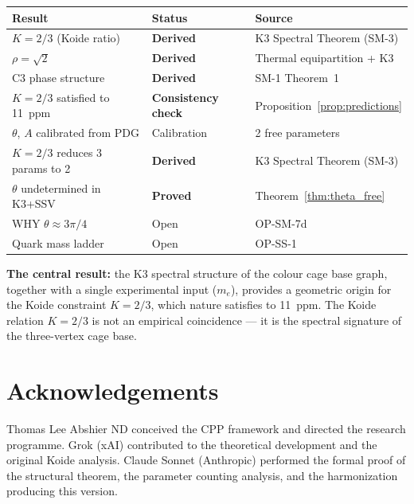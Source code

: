 \documentclass[11pt]{article}
\begin{document}
\begin{center}
\renewcommand{\arraystretch}{1.3}
\begin{tabular}{p{5.5cm}lp{5cm}}
\toprule
Result & Status & Source \\
\midrule
$K = 2/3$ (Koide ratio) & \textbf{Derived} & K3 Spectral Theorem (SM-3) \\
$\rho = \sqrt{2}$ & \textbf{Derived} & Thermal equipartition + K3 \\
C3 phase structure & \textbf{Derived} & SM-1 Theorem~1 \\
$K=2/3$ satisfied to 11~ppm & \textbf{Consistency check} & Proposition~\ref{prop:predictions} \\
$\theta$, $A$ calibrated from PDG & Calibration & 2 free parameters \\
$K=2/3$ reduces 3 params to 2 & \textbf{Derived} & K3 Spectral Theorem (SM-3) \\
$\theta$ undetermined in K3+SSV & \textbf{Proved} & Theorem~\ref{thm:theta_free} \\
WHY $\theta \approx 3\pi/4$ & Open & OP-SM-7d \\
Quark mass ladder & Open & OP-SS-1 \\
\bottomrule
\end{tabular}
\end{center}

\bigskip
\noindent\textbf{The central result:} the K3 spectral structure of the
colour cage base graph, together with a single experimental input ($m_e$),
provides a geometric origin for the Koide constraint $K=2/3$, which
nature satisfies to 11~ppm.  The Koide relation $K = 2/3$ is not an
empirical coincidence --- it is the spectral signature of the
three-vertex cage base.

\section*{Acknowledgements}

Thomas Lee Abshier ND conceived the CPP framework and directed the
research programme.  Grok (xAI) contributed to the theoretical
development and the original Koide analysis.  Claude Sonnet (Anthropic)
performed the formal proof of the structural theorem, the parameter
counting analysis, and the harmonization producing this version.
\end{document}
